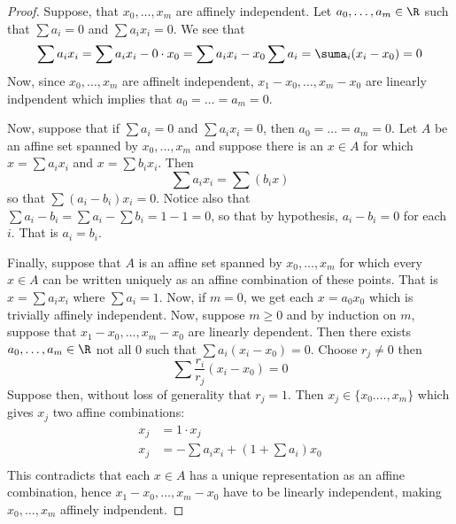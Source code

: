 \begin{proof}
    Suppose, that $x_0, \dots, x_m$ are affinely independent. Let $a_0, \dots,
    a_m \in \R$ such that $\sum{a_i}=0$ and $\sum{a_ix_i}=0$. We see that
    \begin{equation*}
        \sum{a_ix_i}=\sum{a_ix_i-0 \cdot x_0}=\sum{a_ix_i-x_0\sum{a_i}}
        =\suma_i(x_i-x_0)=0
    \end{equation*}
    Now, since $x_0, \dots, x_m$ are affinelt independent, $x_1-x_0, \dots,
    x_m-x_0$ are linearly indpendent which implies that $a_0=\dots=a_m=0$.

    Now, suppose that if $\sum{a_i}=0$ and $\sum{a_ix_i}=0$, then
    $a_0=\dots=a_m=0$. Let $A$ be an affine set spanned by $x_0, \dots, x_m$ and
    suppose there is an $x \in A$ for which $x=\sum{a_ix_i}$ and
    $x=\sum{b_ix_i}$. Then
    \begin{equation*}
        \sum{a_ix_i}=\sum{(b_ix)}
    \end{equation*}
    so that $\sum{(a_i-b_i)x_i}=0$. Notice also that
    $\sum{a_i-b_i}=\sum{a_i}-\sum{b_i}=1-1=0$, so that by hypothesis,
    $a_i-b_i=0$ for each  $i$. That is  $a_i=b_i$.

    Finally, suppose that  $A$ is an affine set spanned by  $x_0, \dots, x_m$
    for which every $x \in A$ can be written uniquely as an affine combination
    of these points. That is $x=\sum{a_ix_i}$ where $\sum{a_i}=1$. Now, if
    $m=0$, we get each  $x=a_0x_0$ which is trivially affinely independent. Now,
    suppose $m \geq 0$ and by induction on  $m$, suppose that  $x_1-x_0, \dots,
    x_m-x_0$ are linearly dependent. Then there exists $a_0, \dots, a_m \in \R$
    not all $0$ such that  $\sum{a_i(x_i-x_0)}=0$. Choose $r_j \neq 0$ then
    \begin{equation*}
        \sum{\frac{r_i}{r_j}(x_i-x_0)}=0
    \end{equation*}
    Suppose then, without loss of generality that $r_j=1$. Then  $x_j \in
    \{x_0. \dots, x_m\}$ which gives $x_j$ two affine combinations:
    \begin{align*}
        x_j     &=      1 \cdot x_j     \\
        x_j     &=      -\sum{a_ix_i}+(1+\sum{a_i})x_0      \\
    \end{align*}
    This contradicts that each $x \in A$ has a unique representation as an
    affine combination, hence $x_1-x_0, \dots, x_m-x_0$ have to be linearly
    independent, making $x_0, \dots, x_m$ affinely indpendent.
\end{proof}

